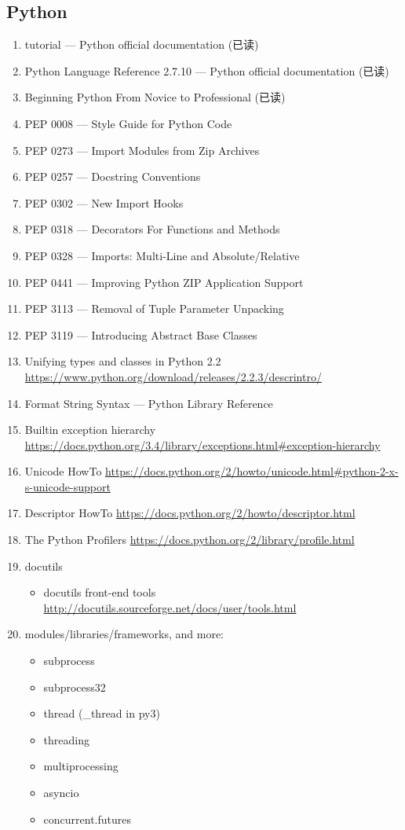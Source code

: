 \documentclass{article}
\begin{document}
\subsection{Python}
\begin{enumerate}
    \item tutorial --- Python official documentation (已读)
    \item Python Language Reference 2.7.10 --- Python official documentation (已读)
    \item Beginning Python From Novice to Professional (已读)
    \item PEP 0008 --- Style Guide for Python Code
    \item PEP 0273 --- Import Modules from Zip Archives
    \item PEP 0257 --- Docstring Conventions
    \item PEP 0302 --- New Import Hooks
    \item PEP 0318 --- Decorators For Functions and Methods
    \item PEP 0328 --- Imports: Multi-Line and Absolute/Relative
    \item PEP 0441 --- Improving Python ZIP Application Support
    \item PEP 3113 --- Removal of Tuple Parameter Unpacking
    \item PEP 3119 --- Introducing Abstract Base Classes
    \item Unifying types and classes in Python 2.2 \url{https://www.python.org/download/releases/2.2.3/descrintro/}
    \item Format String Syntax --- Python Library Reference
    \item Builtin exception hierarchy \url{https://docs.python.org/3.4/library/exceptions.html#exception-hierarchy}
    \item Unicode HowTo \url{https://docs.python.org/2/howto/unicode.html#python-2-x-s-unicode-support}
    \item Descriptor HowTo \url{https://docs.python.org/2/howto/descriptor.html}
    \item The Python Profilers \url{https://docs.python.org/2/library/profile.html}
    \item docutils
        \begin{itemize}
            \item docutils front-end tools \url{http://docutils.sourceforge.net/docs/user/tools.html}
        \end{itemize}
    \item modules/libraries/frameworks, and more:
        \begin{itemize}
            \item subprocess
            \item subprocess32
            \item thread (_thread in py3)
            \item threading
            \item multiprocessing
            \item asyncio
            \item concurrent.futures


\end{itemize}
\end{enumerate}
\end{document}
